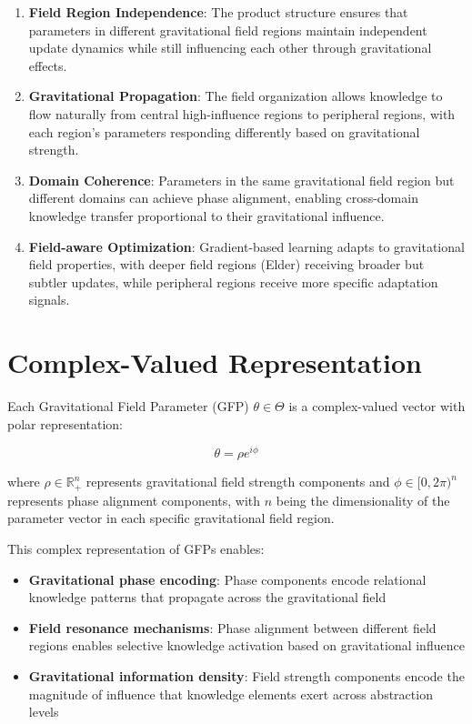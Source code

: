 \begin{definition}
\begin{enumerate}
    \item \textbf{Field Region Independence}: The product structure ensures that parameters in different gravitational field regions maintain independent update dynamics while still influencing each other through gravitational effects.
    
    \item \textbf{Gravitational Propagation}: The field organization allows knowledge to flow naturally from central high-influence regions to peripheral regions, with each region's parameters responding differently based on gravitational strength.
    
    \item \textbf{Domain Coherence}: Parameters in the same gravitational field region but different domains can achieve phase alignment, enabling cross-domain knowledge transfer proportional to their gravitational influence.
    
    \item \textbf{Field-aware Optimization}: Gradient-based learning adapts to gravitational field properties, with deeper field regions (Elder) receiving broader but subtler updates, while peripheral regions receive more specific adaptation signals.
\end{enumerate}
\end{definition}

\section{Complex-Valued Representation}

\begin{definition}
Each Gravitational Field Parameter (GFP) $\theta \in \Theta$ is a complex-valued vector with polar representation:

\begin{equation}
\theta = \rho e^{i\phi}
\end{equation}

where $\rho \in \mathbb{R}^n_+$ represents gravitational field strength components and $\phi \in [0, 2\pi)^n$ represents phase alignment components, with $n$ being the dimensionality of the parameter vector in each specific gravitational field region.
\end{definition}

This complex representation of GFPs enables:
\begin{itemize}
    \item \textbf{Gravitational phase encoding}: Phase components encode relational knowledge patterns that propagate across the gravitational field
    \item \textbf{Field resonance mechanisms}: Phase alignment between different field regions enables selective knowledge activation based on gravitational influence
    \item \textbf{Gravitational information density}: Field strength components encode the magnitude of influence that knowledge elements exert across abstraction levels
\end{itemize}

